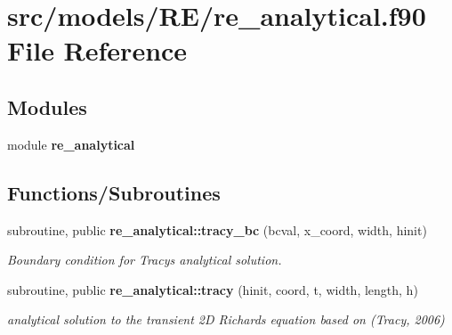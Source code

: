 \section{src/models/\+R\+E/re\+\_\+analytical.f90 File Reference}
\label{re__analytical_8f90}
\subsection*{Modules}
\begin{DoxyCompactItemize}
\item 
module {\bf re\+\_\+analytical}
\end{DoxyCompactItemize}
\subsection*{Functions/\+Subroutines}
\begin{DoxyCompactItemize}
\item 
subroutine, public {\bf re\+\_\+analytical\+::tracy\+\_\+bc} (bcval, x\+\_\+coord, width, hinit)
\begin{DoxyCompactList}\small\item\em Boundary condition for Tracy\textquotesingle{}s analytical solution. \end{DoxyCompactList}\item 
subroutine, public {\bf re\+\_\+analytical\+::tracy} (hinit, coord, t, width, length, h)
\begin{DoxyCompactList}\small\item\em analytical solution to the transient 2D Richards\textquotesingle{} equation based on (Tracy, 2006) \end{DoxyCompactList}\end{DoxyCompactItemize}
